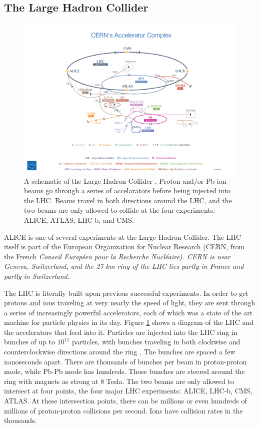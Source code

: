 \subsection{The Large Hadron Collider}
\label{sec:TheLHC}

\begin{figure}[hbt]
\includegraphics[width=36pc]{Figures/BorrowedFigures/CERNComplex.png}
\caption[Schematic of the LHC]{A schematic of the Large Hadron Collider \cite{EspaceCERN}. 
Proton and/or Pb ion beams go through a series of accelarators before being injected into the LHC. Beams travel in both directions around the LHC, and the two beams are only allowed to collide at the four experiments: ALICE, ATLAS, LHC-b, and CMS.}
\label{fig:CERNComplex}
\end{figure}

ALICE is one of several experiments at the Large Hadron Collider.
The LHC itself is part of the European Organization  for Nuclear Research (CERN, from the French \it Conseil Europ\'een pour la Recherche Nucl\'eaire\rm).
CERN is near Geneva, Switzerland, and the 27 km ring of the LHC lies partly in France and partly in Switzerland.

The LHC is literally built upon previous successful experiments. 
In order to get protons and ions traveling at very nearly the speed of light, they are sent through a series of increasingly powerful accelerators, each of which was a state of the art machine for particle physics in its day.
Figure \ref{fig:CERNComplex} shows a diagram of the LHC and the accelerators that feed into it.
Particles are injected into the LHC ring in bunches of up to $10^{11}$ particles, with bunches traveling in both clockwise and counterclockwise directions around the ring \cite{Lefevre:1092437}.
The bunches are spaced a few nanoseconds apart.
There are thousands of bunches per beam in proton-proton mode, while Pb-Pb mode has hundreds.
Those bunches are steered around the ring with magnets as strong at 8 Tesla.
The two beams are only allowed to intersect at four points, the four major LHC experiments: ALICE, LHC-b, CMS, ATLAS.
At these intersection points, there can be millions or even hundreds of millions of proton-proton collisions per second.
Ions have collision rates in the thousands.
 
